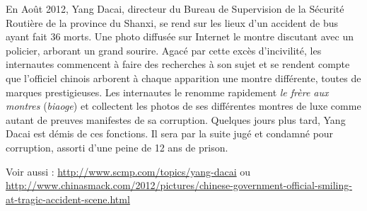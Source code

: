 En Août 2012, Yang Dacai, directeur du Bureau de Supervision de la Sécurité Routière de la province du Shanxi, se rend sur les lieux d'un accident de bus ayant fait 36 morts. Une photo diffusée sur Internet le montre discutant avec un policier, arborant un grand sourire. Agacé par cette excès d'incivilité, les internautes commencent à faire des recherches à son sujet et se rendent compte que l'officiel chinois arborent à chaque apparition une montre différente, toutes de marques prestigieuses. Les internautes le renomme rapidement \textit{le frère aux montres} (\textit{biaoge}) et collectent les photos de ses différentes montres de luxe comme autant de preuves manifestes de sa corruption. Quelques jours plus tard, Yang Dacai est démis de ces fonctions. Il sera par la suite jugé et condamné pour corruption, assorti d'une peine de 12 ans de prison. 

Voir aussi : \url{http://www.scmp.com/topics/yang-dacai} ou \url{http://www.chinasmack.com/2012/pictures/chinese-government-official-smiling-at-tragic-accident-scene.html}

